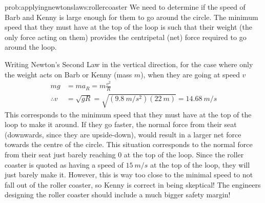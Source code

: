 \begin{solution}{prob:applyingnewtonslaws:rollercoaster}\label{soln:applyingnewtonslaws:rollercoaster} 
We need to determine if the speed of Barb and Kenny is large enough for them to go around the circle. The minimum speed that they must have at the top of the loop is such that their weight (the only force acting on them) provides the centripetal (net) force required to go around the loop. 

Writing Newton's Second Law in the vertical direction, for the case where only the weight acts on Barb or Kenny (mass $m$), when they are going at speed $v$
\begin{align*}
mg &= ma_R = m\frac{v^2}{R}\\
\therefore v &= \sqrt{gR} = \sqrt{(\SI{9.8}{m/s^2})(\SI{22}{m})}=\SI{14.68}{m/s}
\end{align*}
This corresponds to the minimum speed that they must have at the top of the loop to make it around. If they go faster, the normal force from their seat (downwards, since they are upside-down), would result in a larger net force towards the centre of the circle. This situation corresponds to the normal force from their seat just barely reaching 0 at the top of the loop. Since the roller coaster is quoted as having a speed of $\SI{15}{m/s}$ at the top of the loop, they will just barely make it. However, this is way too close to the minimal speed to not fall out of the roller coaster, so Kenny is correct in being skeptical! The engineers designing the roller coaster should include a much bigger safety margin! 
\end{solution}



